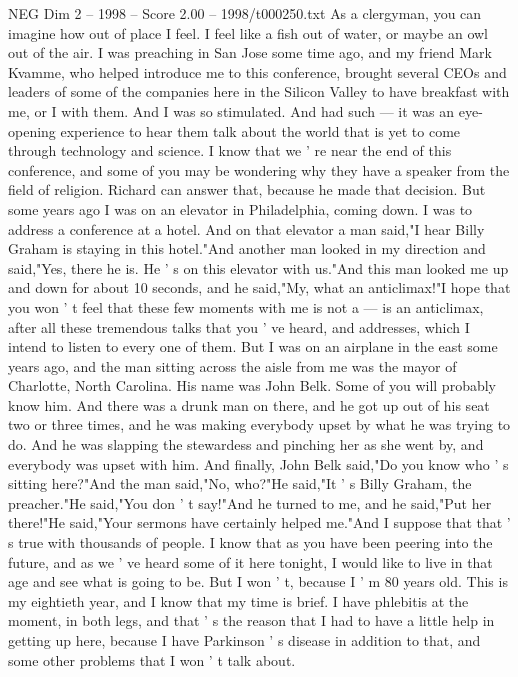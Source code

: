 \begin{textsample}{NEG Dim 2 – 1998 – Score 2.00 – 1998/t000250.txt}  \label{ex:f2_neg_033}
As a clergyman, you can imagine how out of place I feel.
I feel like a fish out of water, or maybe an owl out of the air.
I was preaching in San Jose some time ago, and my friend Mark Kvamme, who helped introduce me to this conference, brought several CEOs and leaders of some of the companies here in the Silicon Valley to have breakfast with me, or I with them.
And I was so stimulated.
And had such — it was an eye-opening experience to hear them talk about the world that is yet to come through technology and science.
I know that we ' re near the end of this conference, and some of you may be wondering why they have a speaker from the field of religion.
Richard can answer that, because he made that decision.
But some years ago I was on an elevator in Philadelphia, coming down.
I was to address a conference at a hotel.
And on that elevator a man said,"I hear Billy Graham is staying in this hotel."And another man looked in my direction and said,"Yes, there he is.
He ' s on this elevator with us."And this man looked me up and down for about 10 seconds, and he said,"My, what an anticlimax!"I hope that you won ' t feel that these few moments with me is not a — is an anticlimax, after all these tremendous talks that you ' ve heard, and addresses, which I intend to listen to every one of them.
But I was on an airplane in the east some years ago, and the man sitting across the aisle from me was the mayor of Charlotte, North Carolina.
His name was John Belk.
Some of you will probably know him.
And there was a drunk man on there, and he got up out of his seat two or three times, and he was making everybody upset by what he was trying to do.
And he was slapping the stewardess and pinching her as she went by, and everybody was upset with him.
And finally, John Belk said,"Do you know who ' s sitting here?"And the man said,"No, who?"He said,"It ' s Billy Graham, the preacher."He said,"You don ' t say!"And he turned to me, and he said,"Put her there!"He said,"Your sermons have certainly helped me."And I suppose that that ' s true with thousands of people.
I know that as you have been peering into the future, and as we ' ve heard some of it here tonight, I would like to live in that age and see what is going to be.
But I won ' t, because I ' m 80 years old.
This is my eightieth year, and I know that my time is brief.
I have phlebitis at the moment, in both legs, and that ' s the reason that I had to have a little help in getting up here, because I have Parkinson ' s disease in addition to that, and some other problems that I won ' t talk about.

\end{textsample}
